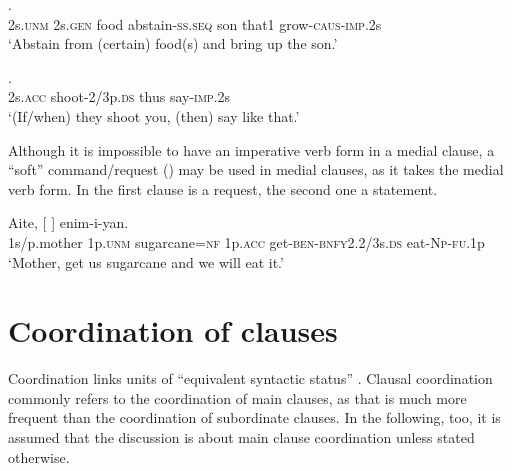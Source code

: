 \ea%
\label{ex:8:x1365}
     .\\
2s.\textsc{unm}  2s.\textsc{gen}  food  abstain-\textsc{ss}.\textsc{seq}  son  that1 grow-\textsc{caus}-\textsc{imp}.2s\\
\glt `Abstain from (certain) food(s) and bring up the son.'  
\z


\ea%
\label{ex:8:x1356}
    . \\
2s.\textsc{acc}  shoot-2/3p.\textsc{ds}  thus  say-\textsc{imp}.2s      \\
\glt `(If/when) they shoot you, (then) say like that.'
\z

Although it is impossible to have an imperative verb form in a medial clause, a ``soft'' command/request () may be used in medial clauses, as it takes the medial verb form. In  the first clause is a request, the second one a statement.

\ea%
\label{ex:8:x1366}
\gll Aite,  [      ] enim-i-yan. \\
1s/p.mother  1p.\textsc{unm}  sugarcane=\textsc{\textsc{nf}}  1p.\textsc{acc}  get-\textsc{ben}-\textsc{bnfy}2.2/3s.\textsc{ds} eat-\textsc{Np}-\textsc{fu}.1p\\
\glt `Mother, get us sugarcane and we will eat it.'
\z

\section{Coordination of clauses} \label{sec:8.1}

Coordination links units of ``equivalent syntactic status'' \citep[93]{Crystal1997}. Clausal coordination commonly refers to the coordination of main clauses, as that is much more frequent than the coordination of subordinate clauses. In the following, too, it is assumed that the discussion is about main clause coordination unless stated otherwise.

